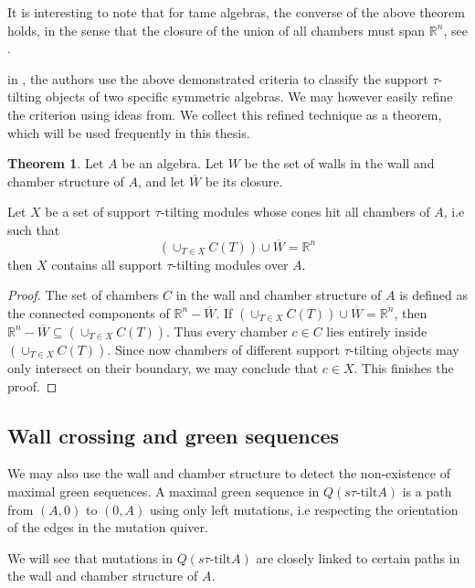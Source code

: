 \documentclass[]{article}
\theoremstyle{definition}
\newtheorem{theorem}{Theorem}[section]
\newcommand{\tu}{\ensuremath{\tau}}
\begin{document}
It is interesting to note that for tame algebras, the converse of the above theorem holds, in the sense that the closure of the union of all chambers must span $\mathbb{R}^n$, see \cite{keller2020tame}.

in \cite{dij17}, the authors use the above demonstrated criteria to classify the support \tu-tilting objects of two specific symmetric algebras. We may however easily refine the criterion using ideas from\cite{Br_stle_2019}. We collect this refined technique as a theorem, which will be used frequently in this thesis.

\begin{theorem}
	Let $A$ be an algebra. Let $W$ be the set of walls in the wall and chamber structure of $A$, and let $\overline{W}$ be its closure.
	
	Let $X$ be a set of support \tu-tilting modules whose cones hit all chambers of $A$, i.e such that \[(\cup_{T \in X} C(T))  \cup \overline{W} = \mathbb{R}^n\]  then $X$ contains all support \tu-tilting modules over $A$.
\end{theorem}

\begin{proof}
	The set of chambers $C$ in the wall and chamber structure of $A$ is defined as the connected components of $\mathbb{R}^n - \overline{W}$. If $(\cup_{T \in X} C(T))  \cup \overline{W} = \mathbb{R}^n$, then $\mathbb{R}^n - \overline{W} \subseteq (\cup_{T \in X} C(T))$. Thus every chamber $c \in C$ lies entirely inside $(\cup_{T \in X} C(T))$. Since now chambers of different support \tu-tilting objects may only intersect on their boundary, we may conclude that $c \in X$. This finishes the proof.
\end{proof}


\subsection{Wall crossing and green sequences}
We may also use the wall and chamber structure to detect the non-existence of maximal green sequences. A maximal green sequence in $Q(s\tu\text{-tilt} A)$ is a path from $(A,0)$ to $(0,A)$ using only left mutations, i.e respecting the orientation of the edges in the mutation quiver.

We will see that mutations in $Q(s\tu\text{-tilt} A)$ are closely linked to certain paths in the wall and chamber structure of $A$.
\end{document}
